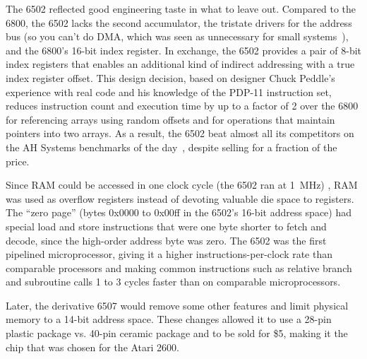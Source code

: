     \begin{geeknote}
The 6502 reflected good engineering taste in what to leave out.
Compared to the 6800, the 6502 lacks the second accumulator, the
tristate drivers for the address bus (so you can't do DMA, which was seen as
unnecessary for small systems~\cite{byte75:6502}), 
and the 6800's 16-bit index register.  In exchange, the 6502 provides a pair
of 8-bit index registers that enables an additional kind of
indirect addressing with a true index register offset.
This design decision, based on designer Chuck Peddle's experience with real
code and his knowledge of the PDP-11 instruction set, 
reduces instruction count and execution time by up to a
factor of 2 over the 6800 for referencing arrays using random
offsets and for operations that
maintain pointers into two arrays.
As a result, the 6502
beat almost all its competitors on  the AH Systems benchmarks of
the day~\cite{edn75:6502}, despite selling for a fraction of the price.

Since RAM could be accessed in one
clock cycle (the 6502 ran at
1~MHz) , RAM was used as overflow registers instead of devoting valuable die
space to registers.  The ``zero
page'' (bytes 0x0000 to 0x00ff in the 6502's 16-bit address space) had
special load and store instructions that were one byte shorter to fetch and
decode, since the high-order address byte was zero.
The 6502 was the first pipelined
microprocessor, giving it a higher instructions-per-clock 
rate than comparable processors and making
common instructions such as relative
branch and subroutine calls 1 to 3 cycles faster than
on comparable microprocessors.  

Later, the derivative 6507 would
remove some other features and limit
physical memory to a 14-bit address space.  These changes allowed it to
use a 28-pin 
plastic package vs. 40-pin ceramic package and to be sold for \$5,
making it the chip that was chosen for the Atari 2600.
    \end{geeknote}
